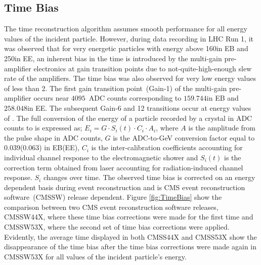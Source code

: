 \subsection{Time Bias}
The time reconstruction algorithm assumes smooth performance for all energy values of the incident particle. However, during data recording in LHC Run 1, it was observed that for very energetic particles with energy above 160\GeV in EB and 250\GeV in EE, an inherent bias in the time is introduced by the multi-gain pre-amplifier electronics at gain transition points due to not-quite-high-enough slew rate of the amplifiers. The time bias was also observed for very low energy values of less than 2\GeV. The first gain transition point~(Gain-1) of the multi-gain pre-amplifier occurs near $4095$~ADC counts corresponding to $159.744$\GeV in EB and $258.048$\GeV in EE. The subsequent Gain-6 and 12 transitions occur at energy values of \TeV.
The full conversion of the energy of a particle recorded by a crystal in ADC counts to \GeV is expressed as; $ E_{i} =  G \cdot S_{i}(t) \cdot C_{i} \cdot A_{i}$, where $A$ is the amplitude from the pulse shape in ADC counts, $G$ is the ADC-to-GeV conversion factor equal to $0.039$($0.063$) in EB(EE), $C_{i}$ is the inter-calibration coefficients accounting for individual channel response to the electromagnetic shower and $S_{i}(t)$ is the correction term obtained from laser accounting for radiation-induced channel response.  $S_{i}$ changes over time.
\newline
The observed time bias is corrected on an energy dependent basis during event reconstruction and is CMS event reconstruction software~(CMSSW) release dependent. Figure \ref{fig:TimeBias} show the comparison between two CMS event reconstruction software releases, CMSSW44X, where these time bias corrections were made for the first time and CMSSW53X, where the second set of time bias corrections were applied. Evidently, the average time displayed in both CMSS44X and CMSS53X show the disappearance of the time bias after the time bias corrections were made again in CMSSW53X for all values of the incident particle's energy. 

